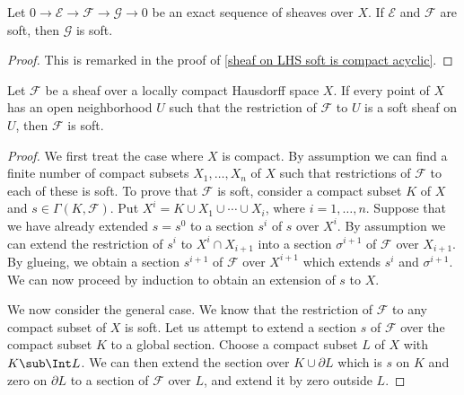 \begin{corollary}\label{sheaf on LHS soft and exact sequence}
Let $0\to\mathscr{E}\to\mathscr{F}\to\mathscr{G}\to 0$ be an exact sequence of sheaves over $X$. If $\mathscr{E}$ and $\mathscr{F}$ are soft, then $\mathscr{G}$ is soft.
\end{corollary}
\begin{proof}
This is remarked in the proof of \cref{sheaf on LHS soft is compact acyclic}.
\end{proof}

\begin{proposition}\label{sheaf on LHS soft is local prop}
Let $\mathscr{F}$ be a sheaf over a locally compact Hausdorff space $X$. If every point of $X$ has an open neighborhood $U$ such that the restriction of $\mathscr{F}$ to $U$ is a soft sheaf on $U$, then $\mathscr{F}$ is soft.
\end{proposition}
\begin{proof}
We first treat the case where $X$ is compact. By assumption we can find a finite number of compact subsets $X_1,\dots,X_n$ of $X$ such that restrictions of $\mathscr{F}$ to each of these is soft. To prove that $\mathscr{F}$ is soft, consider a compact subset $K$ of $X$ and $s\in\Gamma(K,\mathscr{F})$. Put $X^i=K\cup X_1\cup\cdots\cup X_i$, where $i=1,\dots,n$. Suppose that we have already extended $s=s^0$ to a section $s^i$ of $s$ over $X^i$. By assumption we can extend the restriction of $s^i$ to $X^i\cap X_{i+1}$ into a section $\sigma^{i+1}$ of $\mathscr{F}$ over $X_{i+1}$. By glueing, we obtain a section $s^{i+1}$ of $\mathscr{F}$ over $X^{i+1}$ which extends $s^i$ and $\sigma^{i+1}$. We can now proceed by induction to obtain an extension of $s$ to $X$.\par
We now consider the general case. We know that the restriction of $\mathscr{F}$ to any compact subset of $X$ is soft. Let us attempt to extend a section $s$ of $\mathscr{F}$ over the compact subset $K$ to a global section. Choose a compact subset $L$ of $X$ with $K\sub\Int L$. We can then extend the section over $K\cup\partial L$ which is $s$ on $K$ and zero on $\partial L$ to a section of $\mathscr{F}$ over $L$, and extend it by zero outside $L$. 
\end{proof}

